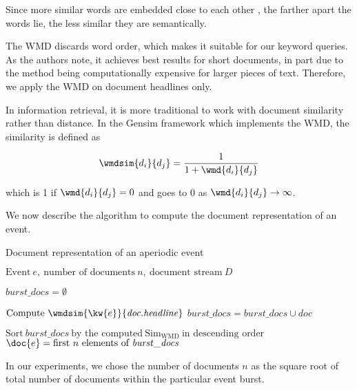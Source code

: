 Since more similar words are embedded close to each other \cite{linguistic-regularities}, the farther apart the words lie, the less similar they are semantically.

The WMD discards word order, which makes it suitable for our keyword queries. As the authors note, it achieves best results for short documents, in part due to the method being computationally expensive for larger pieces of text. Therefore, we apply the WMD on document headlines only.

In information retrieval, it is more traditional to work with document similarity rather than distance. In the Gensim framework \cite{gensim} which implements the WMD, the similarity is defined as

\begin{equation}
	\wmdsim{d_{i}}{d_{j}} = \frac{1}{1 + \wmd{d_{i}}{d_{j}}}
\end{equation}

which is 1 if $\wmd{d_{i}}{d_{j}} = 0$ and goes to 0 as $\wmd{d_{i}}{d_{j}} \to \infty$.

We now describe the algorithm to compute the document representation of an event.

\begin{algorithm}[H]
\begin{algorithmic}[1]
\caption{Document representation of an aperiodic event}
\Input $\text{Event}\ e,\ \text{number of documents}\ n,\ \text{document stream}\ D$

\State $\mathit{burst\_docs} = \emptyset$

		\State $\text{Compute}\ \wmdsim{\kw{e}}{\mathit{doc.headline}}$
		\State $\mathit{burst\_docs} = \mathit{burst\_docs} \cup \mathit{doc}$
	\EndIf
\EndFor

\State $\text{Sort}\ \mathit{burst\_docs}\ \text{by the computed}\ \text{Sim}_{\text{WMD}} \ \text{in descending order}$
\Output $\doc{e} = \text{first}\ n\ \text{elements of}\ \mathit{burst\_docs}$
\end{algorithmic}
\end{algorithm}

In our experiments, we chose the number of documents $n$ as the square root of total number of documents within the particular event burst.
